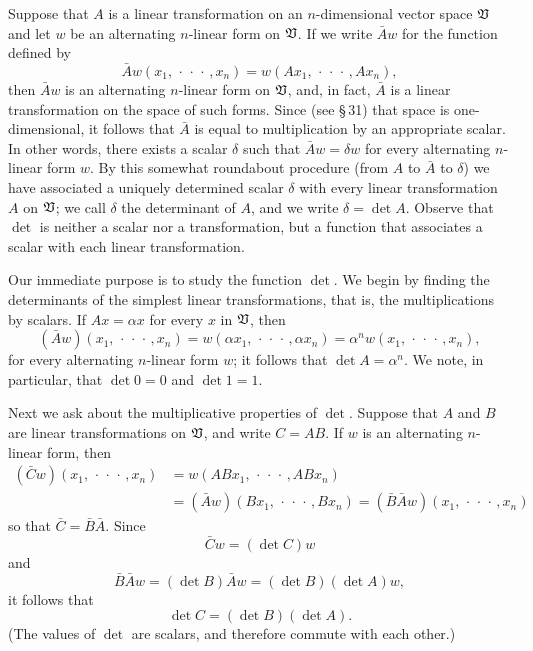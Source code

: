 Suppose that \(A\) is a linear transformation on an \(n\)-dimensional vector
space \(\mathfrak{V}\) and let \(w\) be an alternating \(n\)-linear form on
\(\mathfrak{V}\). If we write \(\bar{A}w\) for the function defined by
\begin{equation*}
    \bar{A}w(x_1, \,\cdot\,\cdot\,\cdot\,, x_n) = w(Ax_1, \,\cdot\,\cdot\,\cdot\,, A x_n),
\end{equation*}
then \(\bar{A}w\) is an alternating \(n\)-linear form on \(\mathfrak{V}\), and, in
fact, \(\bar{A}\) is a linear transformation on the space of such forms. Since
(see \S\,31) that space is one-dimensional, it follows that \(\bar{A}\) is equal
to multiplication by an appropriate scalar. In other words, there exists a
scalar \(\delta\) such that \(\bar{A}w = \delta w\) for every alternating
\(n\)-linear form \(w\). By this somewhat roundabout procedure (from \(A\) to
\(\bar{A}\) to \(\delta\)) we have associated a uniquely determined scalar
\(\delta\) with every linear transformation \(A\) on \(\mathfrak{V}\); we call
\(\delta\) the determinant of \(A\), and we write \(\delta = \det A\). Observe
that \(\det\) is neither a scalar nor a transformation, but a function that
associates a scalar with each linear transformation.

Our immediate purpose is to study the function \(\det\). We begin by finding the
determinants of the simplest linear transformations, that is, the
multiplications by scalars. If \(Ax = \alpha x\) for every \(x\) in \(\mathfrak{V}\),
then
\begin{equation*}
    (\bar{A}w)(x_1, \,\cdot\,\cdot\,\cdot\,, x_n) = w(\alpha x_1, \,\cdot\,\cdot\,\cdot\,, \alpha x_n)
    = \alpha^n w(x_1, \,\cdot\,\cdot\,\cdot\,, x_n),
\end{equation*}
for every alternating \(n\)-linear form \(w\); it follows that \(\det A =
\alpha^n\). We note, in particular, that \(\det 0 = 0\) and \(\det 1 = 1\).

Next we ask about the multiplicative properties of \(\det\). Suppose that \(A\)
and \(B\) are linear transformations on \(\mathfrak{V}\), and write \(C = AB\). If
\(w\) is an alternating \(n\)-linear form, then
\begin{align*}
    (\bar{C}w)(x_1, \,\cdot\,\cdot\,\cdot\,, x_n) & = w (ABx_1, \,\cdot\,\cdot\,\cdot\,, ABx_n) \\
    & = (\bar{A}w)(Bx_1, \,\cdot\,\cdot\,\cdot\,, Bx_n) = (\bar{B}\bar{A}w)(x_1, \,\cdot\,\cdot\,\cdot\,, x_n)
\end{align*}
so that \(\bar{C} = \bar{B}\bar{A}\). Since
\begin{equation*}
    \bar{C}w = (\det C)w
\end{equation*}
and
\begin{equation*}
    \bar{B}\bar{A}w = (\det B)\bar{A}w = (\det B)(\det A)w,
\end{equation*}
it follows that
\begin{equation*}
    \det C = (\det B)(\det A).
\end{equation*}
(The values of \(\det\) are scalars, and therefore commute with each other.)

